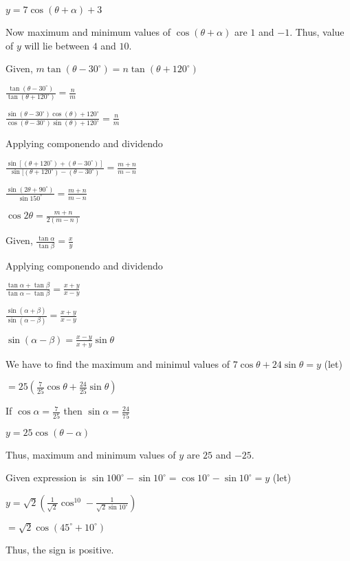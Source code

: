   $y = 7\cos(\theta + \alpha) + 3$

  Now maximum and minimum values of $\cos(\theta + \alpha)$ are $1$ and $-1.$ Thus, value of $y$ will lie
  between $4$ and $10.$

\item Given, $m\tan(\theta - 30^\circ) = n\tan(\theta + 120^\circ)$

  $\frac{\tan(\theta - 30^\circ)}{\tan(\theta + 120^\circ)} = \frac{n}{m}$

  $\frac{\sin(\theta - 30^\circ)\cos(\theta) + 120^\circ}{\cos(\theta - 30^\circ)\sin(\theta) + 120^\circ} = \frac{n}{m}$

  Applying componendo and dividendo

  $\frac{\sin[(\theta + 120^\circ) + (\theta - 30^\circ)]}{\sin[(\theta + 120^\circ) - (\theta - 30^\circ)} = \frac{m +
      n}{m - n}$

  $\frac{\sin(2\theta + 90^\circ)}{\sin150^\circ} = \frac{m + n}{m - n}$

  $\cos2\theta = \frac{m + n}{2(m - n)}$

\item Given, $\frac{\tan\alpha}{\tan\beta} = \frac{x}{y}$

  Applying componendo and dividendo

  $\frac{\tan\alpha + \tan\beta}{\tan\alpha - \tan\beta} = \frac{x + y}{x - y}$

  $\frac{\sin(\alpha + \beta)}{\sin(\alpha - \beta)} = \frac{x + y}{x - y}$

  $\sin(\alpha - \beta) = \frac{x - y}{x + y}\sin\theta$

\item We have to find the maximum and minimul values of $7\cos\theta + 24\sin\theta = y$ (let)

  $= 25\left(\frac{7}{25}\cos\theta + \frac{24}{25}\sin\theta\right)$

  If $\cos\alpha = \frac{7}{25}$ then $\sin\alpha = \frac{24}{75}$

  $y = 25\cos(\theta - \alpha)$

  Thus, maximum and minimum values of $y$ are $25$ and $-25.$

\item Given expression is $\sin100^\circ - \sin10^\circ = \cos10^\circ - \sin10^\circ = y$ (let)

  $y = \sqrt{2}\left(\frac{1}{\sqrt{2}}\cos^10 - \frac{1}{\sqrt{2}\sin10^\circ}\right)$

  $= \sqrt{2}\cos(45^\circ + 10^\circ)$

  Thus, the sign is positive.
\stopitemize

